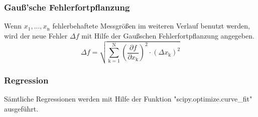 \subsubsection{Gauß'sche Fehlerfortpflanzung}
Wenn $x_\text{1}, ..., x_\text{n}$ fehlerbehaftete Messgrößen im weiteren Verlauf benutzt werden, wird der neue Fehler $\Delta f$ mit Hilfe der Gaußschen Fehlerfortpflanzung angegeben.
\begin{equation}
	\Delta f = \sqrt{\sum_{\text{k}=1}^\text{N} \left( \frac{ \partial f}{\partial x_\text{k}} \right) ^2 \cdot (\Delta x_\text{k})^2}
	\label{eqn:var}
\end{equation}

\subsubsection{Regression}
Sämtliche Regressionen werden mit Hilfe der Funktion "scipy.optimize.curve_fit" ausgeführt.
